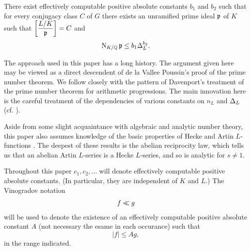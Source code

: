 \documentclass[./main]{subfiles}
\begin{document}
\begin{theorem*}
There exist effectively computable positive absolute constants $b_1$ and $b_2$ such that for every conjugacy class $C$ of $G$ there exists an unramified prime ideal $\mathfrak{p}$ of $K$ such that $\bigg[\dfrac{L/K}{\mathfrak{p}}\bigg] = C$ and
\[ \operatorname{N}_{K/\mathbb{Q}} \mathfrak{p} \le b_1 \Delta_L^{b_2}. \]
\end{theorem*}

The approach used in this paper has a long history. The argument given here may be viewed as a direct descendent of de la Vallee Poussin's proof of the prime number theorem. We follow closely with the pattern of Davenport's treatment \cite{2-davenport2013multiplicative} of the prime number theorem for arithmetic progressions. The main innovation here is the careful treatment of the dependencies of various constants on $n_L$ and $\Delta_L$ (cf. \cite{2-davenport2013multiplicative, 4.1-Fogels1962, 4.2-Fogels1962, 4.3-Fogels1962, 5-goldstein1970, 8-lang1971, 10-Moreno}).

Aside from some slight acquaintance with algebraic and analytic number theory, this paper also assumes knowledge of the basic properties of Hecke and Artin $L$-functions \cite{6-Hilbronn1967}. The deepest of these results is the abelian reciprocity law, which tells us that an abelian Artin $L$-series is a Hecke $L$-series, and so is analytic for $s\ne 1$. 

Throughout this paper $c_1, c_2, \dots$ will denote effectively computable positive absolute constants. (In particular, they are independent of $K$ and $L$.) The Vinogradov notation
\[ f \ll g \]
will be used to denote the existence of an effectively computable positive absolute constant $A$ (not necessary the esame in each occurance) such that
\[ |f| \le Ag, \]
in the range indicated.
\end{document}
